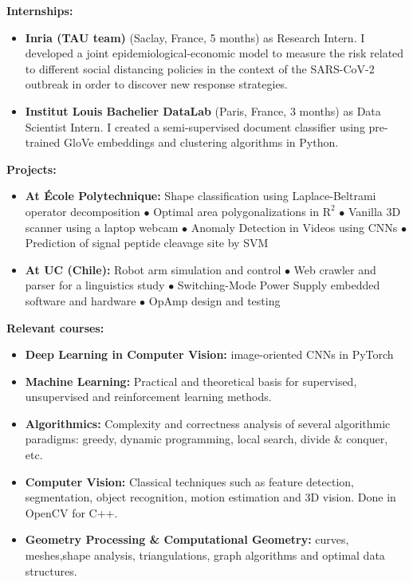 
{\large \textbf{Internships:}}
\begin{itemize}
    \item \textbf{Inria (TAU team)} (Saclay, France, 5 months) as Research Intern. I developed a joint epidemiological-economic model to measure the risk related to different social distancing policies in the context of the SARS-CoV-2 outbreak in order to discover new response strategies.

    \item \textbf{Institut Louis Bachelier DataLab} (Paris, France, 3 months) as Data Scientist Intern. I created a semi-supervised document classifier using pre-trained GloVe embeddings and clustering algorithms in Python.
\end{itemize}

{\large \textbf{Projects:}}



\begin{itemize}
    \item \textbf{At École Polytechnique:}
    Shape classification using Laplace-Beltrami operator decomposition $\bullet$ Optimal area polygonalizations in $\mathrm R^2$ $\bullet$ Vanilla 3D scanner using a laptop webcam $\bullet$ Anomaly Detection in Videos using CNNs $\bullet$ Prediction of signal peptide cleavage site by SVM
    
    \item \textbf{At UC (Chile):}
    Robot arm simulation and control $\bullet$ Web crawler and parser for a linguistics study $\bullet$ Switching-Mode Power Supply embedded software and hardware $\bullet$ OpAmp design and testing
\end{itemize}

{\large \textbf{Relevant courses:}}
\vspace{-1em}
\begin{multicols}{2}
\begin{itemize}
    \item \textbf{Deep Learning in Computer Vision:} image-oriented CNNs in PyTorch
    \item \textbf{Machine Learning:} Practical and theoretical basis for supervised, unsupervised and reinforcement learning methods. 
    \item \textbf{Algorithmics:} Complexity and correctness analysis of several algorithmic paradigms: greedy, dynamic programming, local search, divide \& conquer, etc.
    \columnbreak
    \item \textbf{Computer Vision:} Classical techniques such as feature detection, segmentation, object recognition, motion estimation and 3D vision. Done in OpenCV for C++.
    \item \textbf{Geometry Processing \& Computational Geometry:} curves, meshes,shape analysis, triangulations, graph algorithms and optimal data structures.
\end{itemize}
\end{multicols}
\vspace{-1.5em}